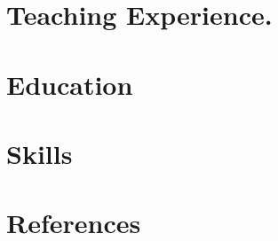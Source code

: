 \documentclass[11pt,a4paper,sans]{moderncv}
\begin{document}
	\makecvtitle

	\section{Teaching Experience.}
	

	\section{Education}
	

	\section{Skills}
	

	\section{References}
	
\end{document}
